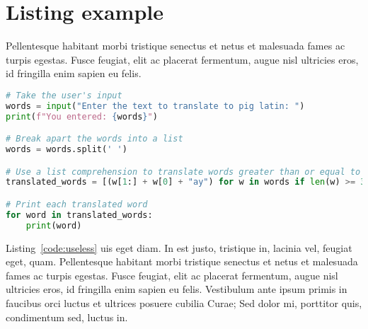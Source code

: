 \section{Listing example}

Pellentesque habitant morbi tristique senectus et netus et
malesuada fames ac turpis egestas. Fusce feugiat, elit ac placerat
fermentum, augue nisl ultricies eros, id fringilla enim sapien eu
felis.

\begin{lstlisting}[language=Python, caption=Python example, label=code:useless]
# Take the user's input
words = input("Enter the text to translate to pig latin: ")
print(f"You entered: {words}")

# Break apart the words into a list
words = words.split(' ')

# Use a list comprehension to translate words greater than or equal to 3 characters
translated_words = [(w[1:] + w[0] + "ay") for w in words if len(w) >= 3 ]

# Print each translated word
for word in translated_words:
    print(word)
\end{lstlisting}

Listing~\ref{code:useless} uis eget diam. In est justo, tristique in, lacinia vel, feugiat eget,
quam. Pellentesque habitant morbi tristique senectus et netus et
malesuada fames ac turpis egestas. Fusce feugiat, elit ac placerat
fermentum, augue nisl ultricies eros, id fringilla enim sapien eu
felis. Vestibulum ante ipsum primis in faucibus orci luctus et
ultrices posuere cubilia Curae; Sed dolor mi, porttitor quis,
condimentum sed, luctus in.